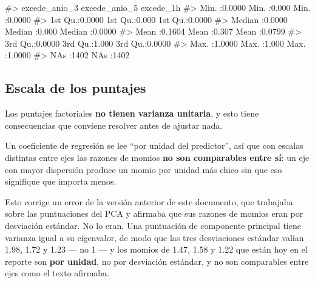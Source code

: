 \documentclass[
  spanish,
  letterpaper,
  DIV=11,
  numbers=noendperiod]{scrartcl}
\newenvironment{Shaded}{\begin{snugshade}}{\end{snugshade}}
\newcommand{\CommentTok}[1]{\textcolor[rgb]{0.37,0.37,0.37}{#1}}
\newcommand{\DecValTok}[1]{\textcolor[rgb]{0.68,0.00,0.00}{#1}}
\newcommand{\FunctionTok}[1]{\textcolor[rgb]{0.28,0.35,0.67}{#1}}
\newcommand{\NormalTok}[1]{\textcolor[rgb]{0.00,0.23,0.31}{#1}}
\newcommand{\OtherTok}[1]{\textcolor[rgb]{0.00,0.23,0.31}{#1}}
\newcommand{\SpecialCharTok}[1]{\textcolor[rgb]{0.37,0.37,0.37}{#1}}
\newcommand{\StringTok}[1]{\textcolor[rgb]{0.13,0.47,0.30}{#1}}
\begin{document}
\begin{Shaded}
\begin{Highlighting}[]
\CommentTok{\#\textgreater{}  excede\_anio\_3    excede\_anio\_5     excede\_1h     }
\CommentTok{\#\textgreater{}  Min.   :0.0000   Min.   :0.000   Min.   :0.0000  }
\CommentTok{\#\textgreater{}  1st Qu.:0.0000   1st Qu.:0.000   1st Qu.:0.0000  }
\CommentTok{\#\textgreater{}  Median :0.0000   Median :0.000   Median :0.0000  }
\CommentTok{\#\textgreater{}  Mean   :0.1604   Mean   :0.307   Mean   :0.0799  }
\CommentTok{\#\textgreater{}  3rd Qu.:0.0000   3rd Qu.:1.000   3rd Qu.:0.0000  }
\CommentTok{\#\textgreater{}  Max.   :1.0000   Max.   :1.000   Max.   :1.0000  }
\CommentTok{\#\textgreater{}  NAs    :1402     NAs    :1402}
\end{Highlighting}
\end{Shaded}

\subsection{Escala de los puntajes}\label{escala-de-los-puntajes}

Los puntajes factoriales \textbf{no tienen varianza unitaria}, y esto
tiene consecuencias que conviene resolver antes de ajustar nada.

\begin{Shaded}
\end{Shaded}

Un coeficiente de regresión se lee ``por unidad del predictor'', así que
con escalas distintas entre ejes las razones de momios \textbf{no son
comparables entre sí}: un eje con mayor dispersión produce un momio por
unidad más chico sin que eso signifique que importa menos.

Esto corrige un error de la versión anterior de este documento, que
trabajaba sobre las puntuaciones del PCA y afirmaba que sus razones de
momios eran por desviación estándar. No lo eran. Una puntuación de
componente principal tiene varianza igual a su eigenvalor, de modo que
las tres desviaciones estándar valían 1.98, 1.72 y 1.23 --- no 1 --- y
los momios de 1.47, 1.58 y 1.22 que están hoy en el reporte son
\textbf{por unidad}, no por desviación estándar, y no son comparables
entre ejes como el texto afirmaba.
\end{document}
